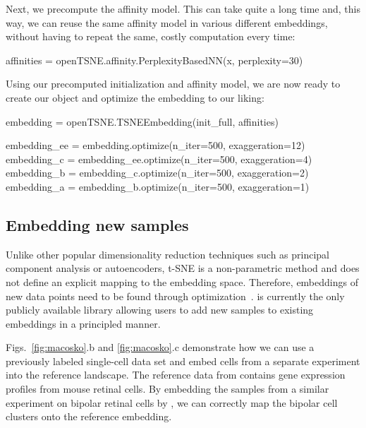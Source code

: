 \documentclass[article]{jss}
\newcommand{\opentsne}{\pkg{openTSNE}\xspace}
\begin{document}
Next, we precompute the affinity model. This can take quite a long time and, this way, we can reuse the same affinity model in various different embeddings, without having to repeat the same, costly computation every time:
\begin{CodeChunk}
\begin{CodeInput}
affinities = openTSNE.affinity.PerplexityBasedNN(x, perplexity=30)
\end{CodeInput}
\end{CodeChunk}

Using our precomputed initialization and affinity model, we are now ready to create our  object and optimize the embedding to our liking: 
\begin{CodeChunk}
\begin{CodeInput}
embedding = openTSNE.TSNEEmbedding(init_full, affinities)

embedding_ee = embedding.optimize(n_iter=500, exaggeration=12)
embedding_c = embedding_ee.optimize(n_iter=500, exaggeration=4)
embedding_b = embedding_c.optimize(n_iter=500, exaggeration=2)
embedding_a = embedding_b.optimize(n_iter=500, exaggeration=1)
\end{CodeInput}
\end{CodeChunk}


\subsection{Embedding new samples}

Unlike other popular dimensionality reduction techniques such as principal component analysis or autoencoders, t-SNE is a non-parametric method and does not define an explicit mapping to the embedding space. Therefore, embeddings of new data points need to be found through optimization~\citep{policar2021embedding}. \opentsne is currently the only publicly available library allowing users to add new samples to existing embeddings in a principled manner.

Figs.~\ref{fig:macosko}.b and \ref{fig:macosko}.c demonstrate how we can use a previously labeled single-cell data set and embed cells from a separate experiment into the reference landscape. The reference data from \citet{macosko2015highly} contains gene expression profiles from mouse retinal cells. By embedding the samples from a similar experiment on bipolar retinal cells by \citet{shekhar2016comprehensive}, we can correctly map the bipolar cell clusters onto the reference embedding.
\end{document}
